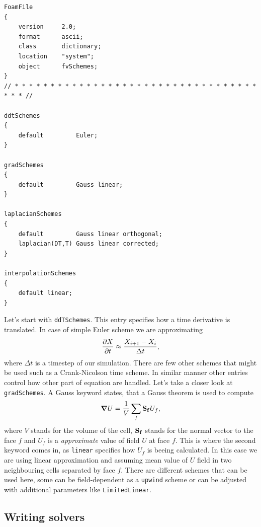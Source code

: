 \documentclass{article}
\begin{document}
\begin{verbatim}
FoamFile
{
    version     2.0;
    format      ascii;
    class       dictionary;
    location    "system";
    object      fvSchemes;
}
// * * * * * * * * * * * * * * * * * * * * * * * * * * * * * * * * * * * * * //

ddtSchemes
{
    default         Euler;
}

gradSchemes
{
    default         Gauss linear;
}

laplacianSchemes
{
    default         Gauss linear orthogonal;
    laplacian(DT,T) Gauss linear corrected;
}

interpolationSchemes
{
    default linear;
}

\end{verbatim}
Let's start with \texttt{ddTSchemes}. This entry specifies how a time derivative is translated. In case of simple Euler scheme we are approximating
\begin{equation}
    \pdv{X}{t} \approx \frac{X_{i+1}-X_{i}}{\Delta t},
\end{equation} where $\Delta t$ is a timestep of our simulation. There are few other schemes that might be used such as a  Crank-Nicolson time scheme.
In similar manner other entries control how other part of equation are handled. Let's take a closer look at \texttt{gradSchemes}.
A Gauss keyword states, that a Gauss theorem is used to compute 
\begin{equation}
    \grad{U} = \frac{1}{V} \sum_f \vb{S_f} U_f,
\end{equation} where $V$ stands for the volume of the cell, $\vb{S_f}$ stands for the normal vector 
to the face $f$ and $U_f$ is a {\it approximate} value of field $U$ at face $f$. This is where the second keyword comes in, as 
\texttt{linear} specifies how $U_f$ is beeing calculated. In this case we are using linear approximation and assuming mean value of 
$U$ field in two neighbouring cells separated by face $f$. There are different schemes that can be used here, some can be field-dependent as a \texttt{upwind} scheme 
or can be adjusted with additional parameters like \texttt{LimitedLinear}.


\subsection{Writing solvers}
\end{document}
